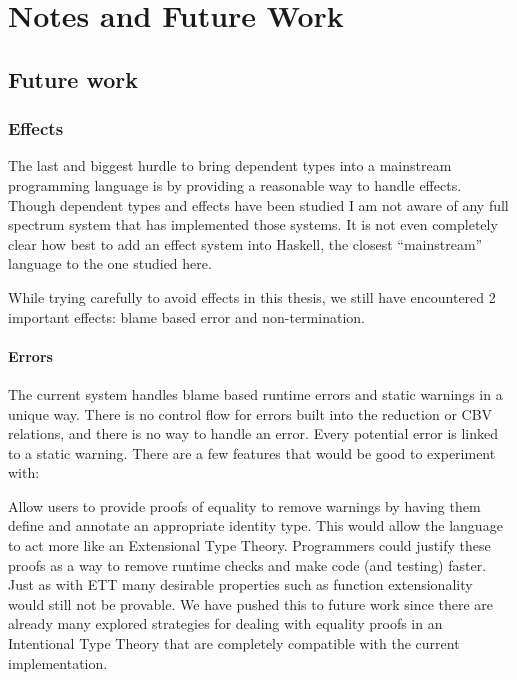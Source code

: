 \chapter{Notes and Future Work}
\label{chapter:Notes}
\thispagestyle{myheadings}






\section{Future work}


\subsection{Effects}

The last and biggest hurdle to bring dependent types into a mainstream programming language is by providing a reasonable way to handle effects.
Though dependent types and effects have been studied I am not aware of any full spectrum system that has implemented those systems.
It is not even completely clear how best to add an effect system into Haskell, the closest ``mainstream'' language to the one studied here.

While trying carefully to avoid effects in this thesis, we still have encountered 2 important effects: blame based error and non-termination.

\subsubsection{Errors}

The current system handles blame based runtime errors and static warnings in a unique way.
There is no control flow for errors built into the reduction or CBV relations, and there is no way to handle an error.
Every potential error is linked to a static warning.
There are a few features that would be good to experiment with:

Allow users to provide proofs of equality to remove warnings by having them define and annotate an appropriate identity type.
This would allow the language to act more like an Extensional Type Theory.
Programmers could justify these proofs as a way to remove runtime checks and make code (and testing) faster.
Just as with \ac{ETT} many desirable properties such as function extensionality would still not be provable.
We have pushed this to future work since there are already many explored strategies for dealing with equality proofs in an Intentional Type Theory that are completely compatible with the current implementation.

